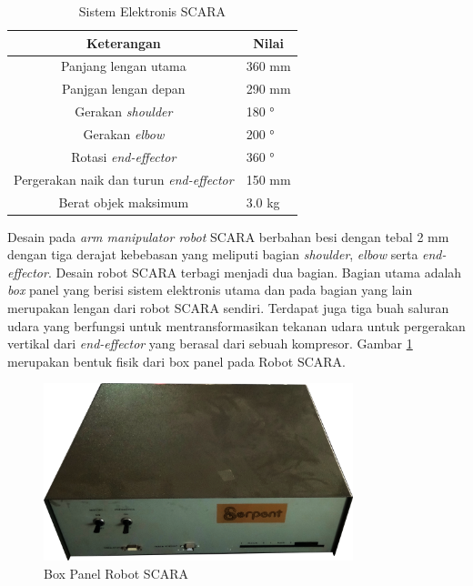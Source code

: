 \begin{longtable}{|c|l|}
	\caption{Sistem Elektronis SCARA}
	\label{tbl.elektronisscara}\\
	\hline
	\rowcolor[HTML]{9B9B9B} 
	Keterangan & \multicolumn{1}{c|}{\cellcolor[HTML]{9B9B9B}Nilai} \\ \hline
	\endfirsthead
	\endhead
	 Panjang lengan utama & 360 mm                                             \\ \hline
	Panjgan lengan depan  & 290 mm                                                    \\ \hline
	Gerakan \textit{shoulder}  &180 °                                  \\ \hline
	Gerakan \textit{elbow}  & 200 °                                  \\ \hline
	Rotasi \textit{end-effector}  & 360 °                                   \\ \hline
	Pergerakan naik dan turun \textit{end-effector}  &  150 mm                            \\ \hline
	Berat objek maksimum  &  3.0 kg                                                 \\ \hline

\end{longtable}

Desain pada\textit{ arm manipulator robot} SCARA berbahan besi dengan tebal 2 mm dengan tiga derajat kebebasan yang meliputi bagian \textit{shoulder}, \textit{elbow} serta \textit{end-effector}. Desain robot SCARA terbagi menjadi dua bagian. Bagian utama adalah \textit{box} panel yang berisi sistem elektronis utama dan pada bagian yang lain merupakan lengan dari robot SCARA sendiri. Terdapat juga tiga buah saluran udara yang berfungsi untuk mentransformasikan tekanan udara untuk pergerakan vertikal dari \textit{end-effector} yang berasal dari sebuah kompresor. Gambar \ref{pic.boxpanel} merupakan bentuk fisik dari box panel pada Robot SCARA.
\begin{figure}[H]
	\centering
	\includegraphics[width=9cm]{gambar/boxpanel.png}
	\caption{Box Panel Robot SCARA}
	\label{pic.boxpanel}
\end{figure}

